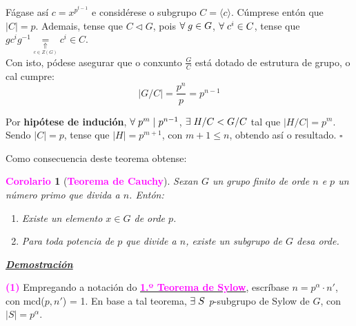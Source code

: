 \documentclass[twoside]{report}
\newcommand{\magbf}[1]{\textcolor{magenta}{\textbf{#1}}} %
\theoremstyle{mystyle}
\newtheorem{cor}{\magbf{Corolario}}[chapter]
\newenvironment{corollary}
{\begin{mdframed}[linecolor = magenta,backgroundcolor = classicrose, linewidth = 2mm]\begin{cor}}
{\end{cor}\end{mdframed}}
\begin{document}
\noindent Fágase así $c = x^{p^{t-1}}$ e considérese o subgrupo $C = \langle c \rangle$. Cúmprese entón que $|C| = p$. Ademais, tense que $C \triangleleft G$, pois $\forall \hspace{1mm} g \in G$, $\forall \hspace{1mm} c^{i} \in C$, tense que $gc^{i}g^{-1} \underset{\underset{c \in Z(G)}{\Uparrow}}{=} c^{i} \in C$.\\

\noindent Con isto, pódese asegurar que o conxunto $\displaystyle \frac{G}{C}$ está dotado de estrutura de grupo, o cal cumpre:
$$|G/C| = \displaystyle \frac{p^{n}}{p} = p^{n-1}$$

\noindent Por \textbf{hipótese de indución}, $\forall \hspace{1mm} p^{m} \hspace{1mm} | \hspace{1mm} p^{n-1}$, $\exists \hspace{1mm} H/C < G/C$ tal que $|H/C| = p^{m}$. Sendo $|C| = p$, tense que $|H| = p^{m+1}$, con $m+1 \leq n$, obtendo así o resultado. $\square$\\

\vspace{3mm}

\noindent Como consecuencia deste teorema obtense:\\

\begin{corollary}[\magbf{Teorema de Cauchy}] \label{cor1.6}
Sexan $G$ un grupo finito de orde $n$ e $p$ un número primo que divida a $n$. Entón:
\begin{enumerate}
    \item \textit{Existe un elemento $x \in G$ de orde $p$}.
    \item \textit{Para toda potencia de $p$ que divide a $n$, existe un subgrupo de $G$ desa orde}.
\end{enumerate}
\end{corollary}

\vspace{2mm}

\noindent \textbf{\textit{\underline{Demostración}}}

\vspace{2mm}

\noindent \magbf{(1)} Empregando a notación do \hyperref[th1.12]{\magbf{1.º Teorema de Sylow}}, escríbase $n = p^{\alpha} \cdot n'$, con mcd($p,n'$) = 1. En base a tal teorema, $\exists \hspace{1mm} S$ \textit{p}-subgrupo de Sylow de $G$, con $|S| = p^{\alpha}$.
\end{document}
